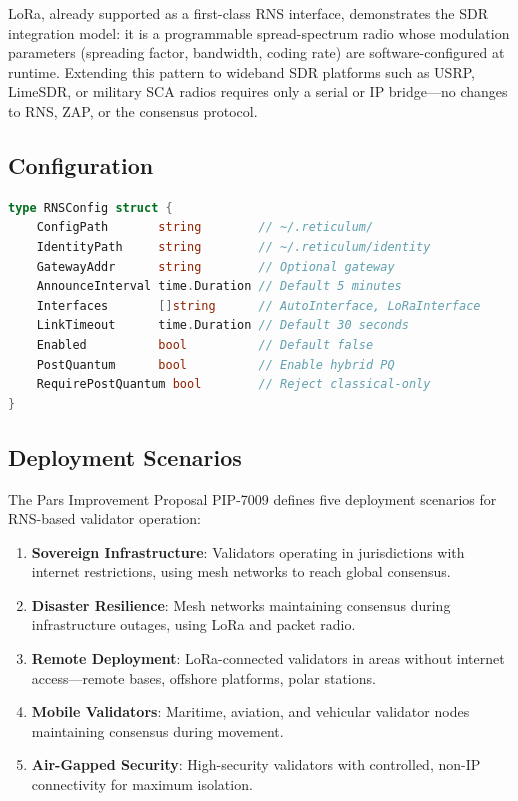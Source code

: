 \documentclass[11pt,letterpaper]{article}
\begin{document}
LoRa, already supported as a first-class RNS interface, demonstrates the SDR integration model: it is a programmable spread-spectrum radio whose modulation parameters (spreading factor, bandwidth, coding rate) are software-configured at runtime. Extending this pattern to wideband SDR platforms such as USRP, LimeSDR, or military SCA radios requires only a serial or IP bridge---no changes to RNS, ZAP, or the consensus protocol.

\subsection{Configuration}

\begin{lstlisting}[language=Go,caption={RNS transport configuration in the Hanzo node.}]
type RNSConfig struct {
    ConfigPath       string        // ~/.reticulum/
    IdentityPath     string        // ~/.reticulum/identity
    GatewayAddr      string        // Optional gateway
    AnnounceInterval time.Duration // Default 5 minutes
    Interfaces       []string      // AutoInterface, LoRaInterface
    LinkTimeout      time.Duration // Default 30 seconds
    Enabled          bool          // Default false
    PostQuantum      bool          // Enable hybrid PQ
    RequirePostQuantum bool        // Reject classical-only
}
\end{lstlisting}

\subsection{Deployment Scenarios}

The Pars Improvement Proposal PIP-7009 defines five deployment scenarios for RNS-based validator operation:

\begin{enumerate}
\item \textbf{Sovereign Infrastructure}: Validators operating in jurisdictions with internet restrictions, using mesh networks to reach global consensus.
\item \textbf{Disaster Resilience}: Mesh networks maintaining consensus during infrastructure outages, using LoRa and packet radio.
\item \textbf{Remote Deployment}: LoRa-connected validators in areas without internet access---remote bases, offshore platforms, polar stations.
\item \textbf{Mobile Validators}: Maritime, aviation, and vehicular validator nodes maintaining consensus during movement.
\item \textbf{Air-Gapped Security}: High-security validators with controlled, non-IP connectivity for maximum isolation.
\end{enumerate}
\end{document}
